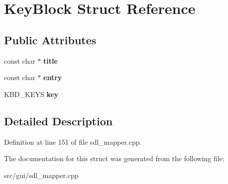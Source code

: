 \hypertarget{structKeyBlock}{\section{Key\-Block Struct Reference}
\label{structKeyBlock}
}
\subsection*{Public Attributes}
\begin{DoxyCompactItemize}
\item 
\hypertarget{structKeyBlock_aa8f0583008d486e791f4712f7206c256}{const char $\ast$ {\bfseries title}}\label{structKeyBlock_aa8f0583008d486e791f4712f7206c256}

\item 
\hypertarget{structKeyBlock_a025404788705e95fb7d9484ee068dd50}{const char $\ast$ {\bfseries entry}}\label{structKeyBlock_a025404788705e95fb7d9484ee068dd50}

\item 
\hypertarget{structKeyBlock_ad7f402307cea47b73666058183ded837}{K\-B\-D\-\_\-\-K\-E\-Y\-S {\bfseries key}}\label{structKeyBlock_ad7f402307cea47b73666058183ded837}

\end{DoxyCompactItemize}


\subsection{Detailed Description}


Definition at line 151 of file sdl\-\_\-mapper.\-cpp.



The documentation for this struct was generated from the following file\-:\begin{DoxyCompactItemize}
\item 
src/gui/sdl\-\_\-mapper.\-cpp\end{DoxyCompactItemize}
